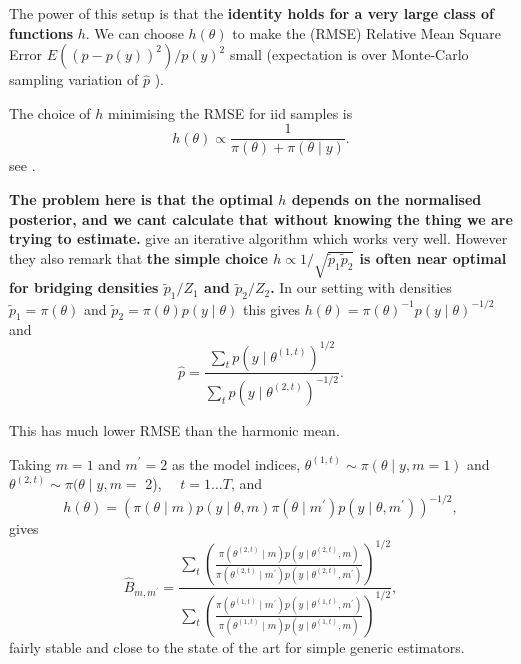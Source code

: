 \documentclass{article}
\begin{document}
The power of this setup is that the \textbf{identity holds for a very large class of functions }$h$. We can choose $h(\theta)$ to make the (RMSE) Relative Mean Square Error $E\left((\hat{p}-p(y))^2\right) / p(y)^2$ small (expectation is over Monte-Carlo sampling variation of $\hat{p}$ ).

The choice of $h$ minimising the RMSE for iid samples is
$$
h(\theta) \propto \frac{1}{\pi(\theta)+\pi(\theta \mid y)} .
$$
see \cite{meng_simulating_1996}.

\textbf{The problem here is that the optimal $h$ depends on the normalised posterior, and we cant calculate that without knowing the thing we are trying to estimate.} \cite{meng_simulating_1996} give an iterative algorithm which works very well. However they also remark that\textbf{ the simple choice $h \propto 1 / \sqrt{\tilde{p}_1 \tilde{p}_2}$ is often near optimal for bridging densities $\tilde{p}_1 / Z_1$ and $\tilde{p}_2 / Z_2$.} In our setting with densities $\tilde{p}_1=\pi(\theta)$ and $\tilde{p}_2=\pi(\theta) p(y \mid \theta)$ this gives $h(\theta)=\pi(\theta)^{-1} p(y \mid \theta)^{-1 / 2}$ and
$$
\hat{p}=\frac{\sum_t p\left(y \mid \theta^{(1, t)}\right)^{1 / 2}}{\sum_t p\left(y \mid \theta^{(2, t)}\right)^{-1 / 2}} .
$$

This has much lower RMSE than the harmonic mean.

Taking $m=1$ and $m^{\prime}=2$ as the model indices, $\theta^{(1, t)} \sim \pi(\theta \mid y, m=1)$ and $\theta^{(2, t)} \sim \pi(\theta \mid y, m=$ 2), $\quad t=1 \ldots T$, and
$$
h(\theta)=\left(\pi(\theta \mid m) p(y \mid \theta, m) \pi\left(\theta \mid m^{\prime}\right) p\left(y \mid \theta, m^{\prime}\right)\right)^{-1 / 2},
$$
gives
$$
\hat{B}_{m, m^{\prime}}=\frac{\sum_t\left(\frac{\pi\left(\theta^{(2, t)} \mid m\right) p\left(y \mid \theta^{(2, t)}, m\right)}{\pi\left(\theta^{(2, t)} \mid m^{\prime}\right) p\left(y \mid \theta^{(2, t)}, m^{\prime}\right)}\right)^{1 / 2}}{\sum_t\left(\frac{\pi\left(\theta^{(1, t)} \mid m^{\prime}\right) p\left(y \mid \theta^{(1, t)}, m^{\prime}\right)}{\pi\left(\theta^{(1, t)} \mid m\right) p\left(y \mid \theta^{(1, t)}, m\right)}\right)^{1 / 2}},
$$
fairly stable and close to the state of the art for simple generic estimators. 
\end{document}
